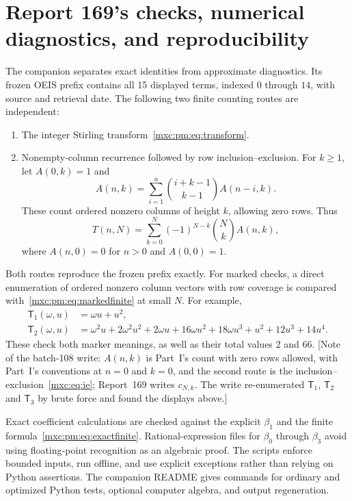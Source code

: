\documentclass[11pt]{article}
\numberwithin{equation}{section}
\theoremstyle{definition}
\theoremstyle{remark}
\begin{document}
\section{Report 169's checks, numerical diagnostics, and reproducibility}\label{mxc:pm:sec:checks}
The companion separates exact identities from approximate diagnostics. Its
frozen OEIS prefix contains all 15 displayed terms, indexed $0$ through $14$,
with source and retrieval date. The following two finite counting routes are
independent:
\begin{enumerate}
\item The integer Stirling transform~\eqref{mxc:pm:eq:transform}.
\item Nonempty-column recurrence followed by row inclusion--exclusion. For
$k\ge1$, let $A(0,k)=1$ and
\[
 A(n,k)=\sum_{i=1}^n\binom{i+k-1}{k-1}A(n-i,k).
\]
These count ordered nonzero columns of height $k$, allowing zero rows. Thus
\[
 T(n,N)=\sum_{k=0}^N(-1)^{N-k}\binom Nk A(n,k),
\]
where $A(n,0)=0$ for $n>0$ and $A(0,0)=1$.
\end{enumerate}
Both routes reproduce the frozen prefix exactly. For marked checks, a direct
enumeration of ordered nonzero column vectors with row coverage is compared
with~\eqref{mxc:pm:eq:markedfinite} at small $N$. For example,
\begin{align*}
 \mathsf T_1(\omega,u)&=\omega u+u^2,\\
 \mathsf T_2(\omega,u)&=\omega^2u+2\omega^2u^2+2\omega u+16\omega u^2+18\omega u^3
                       +u^2+12u^3+14u^4.
\end{align*}
These check both marker meanings, as well as their total values $2$ and $66$.
[Note of the batch-108 write: $A(n,k)$ is Part~I's count with zero rows
allowed, with Part~I's conventions at $n=0$ and $k=0$, and the second route is
the inclusion--exclusion~\eqref{mxc:eq:ie}; Report~169 writes $c_{N,k}$.
The write re-enumerated $\mathsf T_1$, $\mathsf T_2$ and $\mathsf T_3$ by brute
force and found the displays above.]

Exact coefficient calculations are checked against the explicit $\beta_1$ and
the finite formula~\eqref{mxc:pm:eq:exactfinite}. Rational-expression files
for $\beta_0$ through $\beta_3$ avoid using floating-point recognition as an
algebraic proof. The scripts enforce bounded inputs, run offline, and use
explicit exceptions rather than relying on Python assertions. The companion
README gives commands for ordinary and optimized Python tests, optional
computer algebra, and output regeneration.
\end{document}
